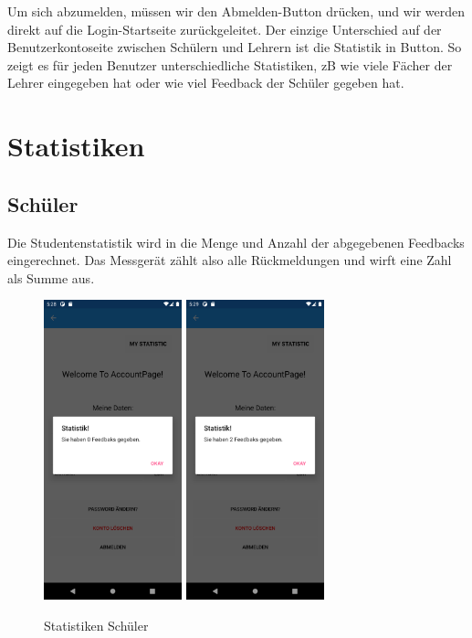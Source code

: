 \newline
Um sich abzumelden, müssen wir den Abmelden-Button drücken, und wir werden direkt auf die Login-Startseite zurückgeleitet.
\newline
Der einzige Unterschied auf der Benutzerkontoseite zwischen Schülern und Lehrern ist die Statistik in Button. So zeigt es für jeden Benutzer unterschiedliche Statistiken, zB wie viele Fächer der Lehrer eingegeben hat oder wie viel Feedback der Schüler gegeben hat.
\newpage

\section{Statistiken}
\subsection{Schüler}
Die Studentenstatistik wird in die Menge und Anzahl der abgegebenen Feedbacks eingerechnet. Das Messgerät zählt also alle Rückmeldungen und wirft eine Zahl als Summe aus.
\begin{figure}[h]
    \begin{center}
        \includegraphics[width=4cm]{pics/Xamarin Student/27 Stat.png}\hfill
        \includegraphics[width=4cm]{pics/Xamarin Student/28 Stat.png}
        \caption[Statistiken]{Statistiken Schüler}
        \end{center}
\end{figure}
\newpage
